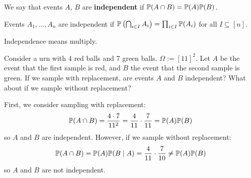 \begin{defbox}
   We say that events $A$, $B$ are \textbf{independent} if $\mathbb{P}(A \cap B) = \mathbb{P}(A)\mathbb{P}(B)$. 

   Events $A_1, \dots, A_n$ are independent if $\mathbb{P}\left(\bigcap_{i \in I}A_i\right) = \prod_{i \in I}\mathbb{P}(A_i)$ for all $I \subseteq [n]$. 
\end{defbox}

\begin{remark}
   Independence means multiply.
\end{remark}

\begin{example}
   Consider a urn with 4 red balls and 7 green balls. $\Omega := [11]^2$. Let $A$ be the event that the first sample is red, and $B$ the event that the second sample is green. If we sample with replacement, are events $A$ and $B$ independent? What about if we sample without replacement?
\end{example}
\begin{solution}
   First, we consider sampling with replacement:
   \[ \mathbb{P}(A \cap B) = \frac{4 \cdot 7}{11^2} = \frac{4}{11} \cdot \frac{7}{11} = \mathbb{P}(A)\mathbb{P}(B) \]
   so $A$ and $B$ are independent. However, if we sample without replacement:
   \[ \mathbb{P}(A \cap B) = \mathbb{P}(A)\mathbb{P}(B \mid A) = \frac{4}{11} \cdot \frac{7}{10} \neq \mathbb{P}(A)\mathbb{P}(B) \]
   so $A$ and $B$ are not independent. 
\end{solution}
